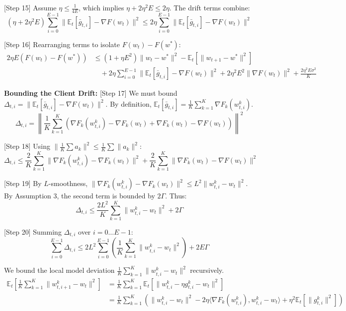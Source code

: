 \documentclass{article}
\begin{document}
[Step 15] Assume $\eta \leq \frac{1}{4E}$, which implies $\eta + 2\eta^2 E \leq 2\eta$. The drift terms combine:
$$ (\eta + 2\eta^2 E) \sum_{i=0}^{E-1} \|\mathbb{E}_t[\bar{g}_{t,i}] - \nabla F(w_t)\|^2 \leq 2\eta \sum_{i=0}^{E-1} \|\mathbb{E}_t[\bar{g}_{t,i}] - \nabla F(w_t)\|^2 $$

[Step 16] Rearranging terms to isolate $F(w_t) - F(w^*)$:
\begin{align*}
2\eta E (F(w_t) - F(w^*)) &\leq (1 + \eta E^2)\|w_t - w^*\|^2 - \mathbb{E}_t[\|w_{t+1} - w^*\|^2] \\
&\quad + 2\eta \sum_{i=0}^{E-1} \|\mathbb{E}_t[\bar{g}_{t,i}] - \nabla F(w_t)\|^2 + 2\eta^2 E^2 \|\nabla F(w_t)\|^2 + \frac{2\eta^2 E \sigma^2}{K}
\end{align*}

\textbf{Bounding the Client Drift:}
[Step 17] We must bound $\Delta_{t,i} = \|\mathbb{E}_t[\bar{g}_{t,i}] - \nabla F(w_t)\|^2$. By definition, $\mathbb{E}_t[\bar{g}_{t,i}] = \frac{1}{K}\sum_{k=1}^K \nabla F_k(w_{t,i}^k)$.
$$ \Delta_{t,i} = \left\| \frac{1}{K}\sum_{k=1}^K \left( \nabla F_k(w_{t,i}^k) - \nabla F_k(w_t) + \nabla F_k(w_t) - \nabla F(w_t) \right) \right\|^2 $$

[Step 18] Using $\|\frac{1}{K}\sum a_k\|^2 \leq \frac{1}{K}\sum \|a_k\|^2$:
$$ \Delta_{t,i} \leq \frac{2}{K}\sum_{k=1}^K \|\nabla F_k(w_{t,i}^k) - \nabla F_k(w_t)\|^2 + \frac{2}{K}\sum_{k=1}^K \|\nabla F_k(w_t) - \nabla F(w_t)\|^2 $$

[Step 19] By $L$-smoothness, $\|\nabla F_k(w_{t,i}^k) - \nabla F_k(w_t)\|^2 \leq L^2 \|w_{t,i}^k - w_t\|^2$. By Assumption 3, the second term is bounded by $2\Gamma$. Thus:
$$ \Delta_{t,i} \leq \frac{2L^2}{K}\sum_{k=1}^K \|w_{t,i}^k - w_t\|^2 + 2\Gamma $$

[Step 20] Summing $\Delta_{t,i}$ over $i=0 \dots E-1$:
$$ \sum_{i=0}^{E-1} \Delta_{t,i} \leq 2L^2 \sum_{i=0}^{E-1} \left( \frac{1}{K}\sum_{k=1}^K \|w_{t,i}^k - w_t\|^2 \right) + 2E\Gamma $$

We bound the local model deviation $\frac{1}{K}\sum_{k=1}^K \|w_{t,i}^k - w_t\|^2$ recursively.
\begin{align*}
\mathbb{E}_t\left[ \frac{1}{K}\sum_{k=1}^K \|w_{t,i+1}^k - w_t\|^2 \right] &= \frac{1}{K}\sum_{k=1}^K \mathbb{E}_t[\|w_{t,i}^k - \eta g_{t,i}^k - w_t\|^2] \\
&= \frac{1}{K}\sum_{k=1}^K \left( \|w_{t,i}^k - w_t\|^2 - 2\eta \langle \nabla F_k(w_{t,i}^k), w_{t,i}^k - w_t \rangle + \eta^2 \mathbb{E}_t[\|g_{t,i}^k\|^2] \right)
\end{align*}
\end{document}
